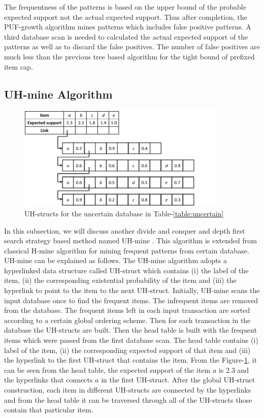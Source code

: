 The frequentness of the patterns is based on the upper bound of the probable expected support not the actual expected support. Thus after completion, the PUF-growth algorithm mines patterns which includes false positive patterns. A third database scan is needed to calculated the actual expected support  of the patterns as  well as to discard the false positives. The number of false positives are much less than the previous tree based algorithm for the tight bound of prefixed item cap. 

\subsection{UH-mine Algorithm}
\begin{figure}
\begin{center}
  \includegraphics[height=5cm,width=\linewidth]{./Figures/uh.png}
\end{center}
  \caption{UH-structs for the uncertain database in Table-\ref{table:uncertain}
  \label{uh}}
\end{figure}

In this subsection, we will discuss another divide and conquer and depth first search strategy based method named UH-mine \cite{uhmine}. This algorithm is extended from classical H-mine algorithm for mining frequent patterns from certain database. UH-mine can be explained as follows. The UH-mine algorithm adopts a hyperlinked data structure called UH-struct which contains (i) the label of the item, (ii) the corresponding existential probability of the item and (iii) the hyperlink to point to the item to the next UH-struct. Initially, UH-mine scans the input database once to find the frequent items. The infrequent items are removed from the database. The frequent items left in each input transaction are sorted according to a certain global ordering scheme. Then for each transaction in the database the UH-structs are built. Then the head table is built with the frequent items which were passed from the first database scan. The head table contains (i) label of the item, (ii) the corresponding expected support of that item and (iii) the hyperlink to the first UH-struct that contains the item. From the Figure-\ref{uh}, it can be seen from the head table, the expected support of the item $a$  is 2.3 and the hyperlinks that connects $a$ in the first UH-struct. After the global UH-struct construction, each item in different UH-structs are connected by the hyperlinks and from the head table it can be traversed through all of the UH-structs those contain that particular item.

